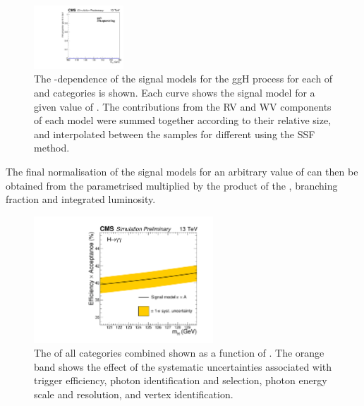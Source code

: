 \begin{figure}[ht!]
\includegraphics[width=0.3\textwidth]{modellingFigures/DCBpG/ggh_ZHLeptonicTag_fmc_interp.pdf} 
\caption{The \mH-dependence of the signal models for the ggH process for each of \TTHTag and \VHTag categories is shown. Each curve shows the signal model for a given value of \mH. The contributions from the RV and WV components of each model were summed together according to their relative size, and interpolated between the samples for different \mH using the SSF method.}

\label{fig:model:sig_interpolation_bis}
\end{figure}

The final normalisation of the signal models for an arbitrary value of \mH can then be obtained from the parametrised \effxacc multiplied by the product of the \crosssection, branching fraction and integrated luminosity. 

\begin{figure}[ht!]
\centering
\includegraphics[width=0.6\textwidth]{modellingFigures/effAcc_vs_mass.pdf} 
\caption{The \effxacc of all categories combined shown as a function of \mH. The orange band shows the effect of the systematic uncertainties associated with trigger efficiency, photon identification and selection, photon energy scale and resolution, and vertex identification.}

\label{fig:model:sig_effxacc}
\end{figure}

